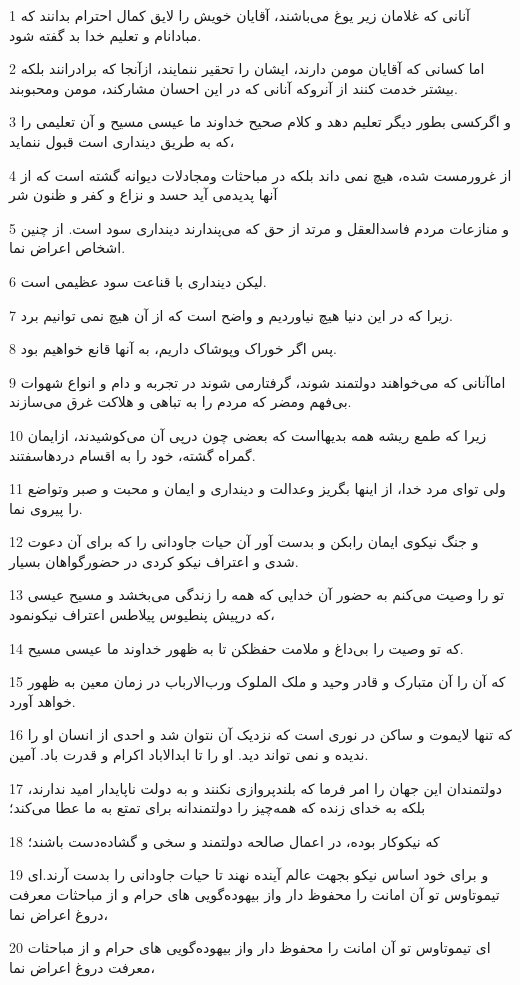 \par 1 آنانی که غلامان زیر یوغ می‌باشند، آقایان خویش را لایق کمال احترام بدانند که مبادانام و تعلیم خدا بد گفته شود.
\par 2 اما کسانی که آقایان مومن دارند، ایشان را تحقیر ننمایند، ازآنجا که برادرانند بلکه بیشتر خدمت کنند از آنروکه آنانی که در این احسان مشارکند، مومن ومحبوبند.
\par 3 و اگرکسی بطور دیگر تعلیم دهد و کلام صحیح خداوند ما عیسی مسیح و آن تعلیمی را که به طریق دینداری است قبول ننماید،
\par 4 از غرورمست شده، هیچ نمی داند بلکه در مباحثات ومجادلات دیوانه گشته است که از آنها پدیدمی آید حسد و نزاع و کفر و ظنون شر
\par 5 و منازعات مردم فاسدالعقل و مرتد از حق که می‌پندارند دینداری سود است. از چنین اشخاص اعراض نما.
\par 6 لیکن دینداری با قناعت سود عظیمی است.
\par 7 زیرا که در این دنیا هیچ نیاوردیم و واضح است که از آن هیچ نمی توانیم برد.
\par 8 پس اگر خوراک وپوشاک داریم، به آنها قانع خواهیم بود.
\par 9 اماآنانی که می‌خواهند دولتمند شوند، گرفتارمی شوند در تجربه و دام و انواع شهوات بی‌فهم ومضر که مردم را به تباهی و هلاکت غرق می‌سازند.
\par 10 زیرا که طمع ریشه همه بدیهااست که بعضی چون در‌پی آن می‌کوشیدند، ازایمان گمراه گشته، خود را به اقسام دردهاسفتند.
\par 11 ولی تو‌ای مرد خدا، از اینها بگریز وعدالت و دینداری و ایمان و محبت و صبر وتواضع را پیروی نما.
\par 12 و جنگ نیکوی ایمان رابکن و بدست آور آن حیات جاودانی را که برای آن دعوت شدی و اعتراف نیکو کردی در حضورگواهان بسیار.
\par 13 تو را وصیت می‌کنم به حضور آن خدایی که همه را زندگی می‌بخشد و مسیح عیسی که در‌پیش پنطیوس پیلاطس اعتراف نیکونمود،
\par 14 که تو وصیت را بی‌داغ و ملامت حفظکن تا به ظهور خداوند ما عیسی مسیح.
\par 15 که آن را آن متبارک و قادر وحید و ملک الملوک ورب‌الارباب در زمان معین به ظهور خواهد آورد.
\par 16 که تنها لایموت و ساکن در نوری است که نزدیک آن نتوان شد و احدی از انسان او را ندیده و نمی تواند دید. او را تا ابدالاباد اکرام و قدرت باد. آمین.
\par 17 دولتمندان این جهان را امر فرما که بلندپروازی نکنند و به دولت ناپایدار امید ندارند، بلکه به خدای زنده که همه‌چیز را دولتمندانه برای تمتع به ما عطا می‌کند؛
\par 18 که نیکوکار بوده، در اعمال صالحه دولتمند و سخی و گشاده‌دست باشند؛
\par 19 و برای خود اساس نیکو بجهت عالم آینده نهند تا حیات جاودانی را بدست آرند.‌ای تیموتاوس تو آن امانت را محفوظ دار واز بیهوده‌گویی های حرام و از مباحثات معرفت دروغ اعراض نما،
\par 20 ‌ای تیموتاوس تو آن امانت را محفوظ دار واز بیهوده‌گویی های حرام و از مباحثات معرفت دروغ اعراض نما،



